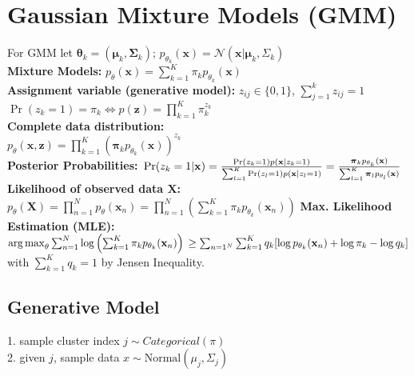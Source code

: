 \section{Gaussian Mixture Models (GMM)}
For GMM let $\boldsymbol{\theta}_k = (\boldsymbol{\mu}_k, \boldsymbol{\Sigma}_k)$; $p_{\theta_k}(\mathbf{x}) = \mathcal{N}(\mathbf{x} | \boldsymbol{\mu}_k, \Sigma_k)$\\
\textbf{Mixture Models:} $p_\theta(\mathbf{x}) = \sum_{k=1}^K \pi_k p_{\theta_k}(\mathbf{x})$\\
\textbf{Assignment variable (generative model):} $z_{ij} \in \{0, 1\}$, $\sum_{j=1}^k z_{ij} = 1$\\
$\operatorname{Pr}(z_k = 1) = \pi_k \Leftrightarrow p(\mathbf{z}) = \prod_{k=1}^K \pi_k^{z_k}$\\
\textbf{Complete data distribution:}\\
$p_\theta(\mathbf{x}, \mathbf{z}) = \prod_{k=1}^K \left( \boldsymbol{\pi}_k p_{\theta_k}(\mathbf{x})\right)^{z_k}$\\
\textbf{Posterior Probabilities:} $\\\operatorname{Pr}(z_k = 1 | \mathbf{x}) = \frac{\operatorname{Pr}(z_k = 1) p(\mathbf{x} | z_k = 1)}{\sum_{l=1}^K \operatorname{Pr}(z_l = 1) p(\mathbf{x} | z_l = 1)} = \frac{\boldsymbol{\pi}_k p_{\theta_k}(\mathbf{x})}{\sum_{l=1}^K \boldsymbol{\pi}_l p_{\theta_l}(\mathbf{x})}$
\textbf{Likelihood of observed data $\mathbf{X}$:}\\
$p_\theta(\mathbf{X}) = \prod_{n=1}^N p_\theta(\mathbf{x}_n) = \prod_{n=1}^N \left(\sum_{k=1}^K \pi_k p_{\theta_k}(\mathbf{x}_n)\right)$
\textbf{Max. Likelihood Estimation (MLE):}\\
$\operatorname*{arg\,max}_\theta\sum_{n=1}^N \log \left( \sum_{k=1}^K \pi_k p_{\theta_k}(\mathbf{x}_n)\right)\\
\ge \sum_{n=1^N} \sum_{k=1}^K{q_k[\log p_{\theta_k}(\mathbf{x}_n) + \log \pi_k - \log q_k]}$\\
with $\sum_{k=1}^K{q_k} = 1$ by Jensen Inequality.

\subsection*{Generative Model}
1. sample cluster index $j \sim Categorical(\pi)$\\
2. given $j$, sample data $x \sim \text{Normal}(\mu_j, \Sigma_j)$


